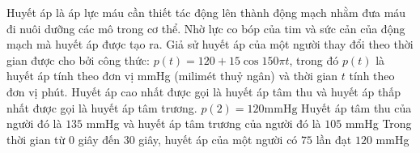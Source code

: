 \begin{ex}%
	Huyết áp là áp lực máu cần thiết tác động lên thành động mạch nhằm đưa máu đi nuôi dưỡng các mô trong cơ thể. Nhờ lực co bóp của tim và sức cản của động mạch mà huyết áp được tạo ra. Giả sử huyết áp của một người thay đổi theo thời gian được cho bởi công thức: $p(t)=120+15 \cos 150 \pi t$, trong đó $p(t)$ là huyết áp tính theo đơn vị mmHg (milimét thuỷ ngân) và thời gian $t$ tính theo đơn vị phút. Huyết áp cao nhất được gọi là huyết áp tâm thu và huyết áp thấp nhất được gọi là huyết áp tâm trương.
	{$p(2)=120 \mathrm{mmHg}$}
	{\True Huyết áp tâm thu của người đó là $135$ mmHg và huyết áp tâm trương của người đó là $105$ mmHg}
	{Trong thời gian từ $0$ giây đến $30$ giây, huyết áp của một người có $75$ lần đạt $120$ mmHg}
\end{ex}


